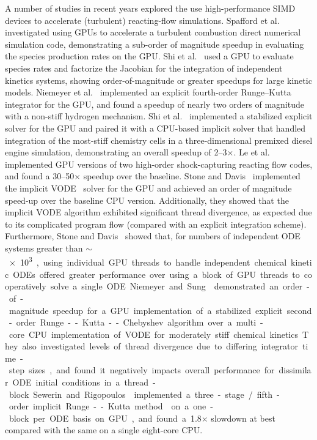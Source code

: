 \documentclass[preprint]{elsarticle}
\begin{document}
A number of studies in recent years explored the use high-performance SIMD devices to accelerate (turbulent) reacting-flow simulations.
Spafford et al.~\cite{Spafford:2010aa} investigated using GPUs to accelerate a turbulent combustion direct numerical simulation code, demonstrating a sub-order of magnitude speedup in evaluating the species production rates on the GPU.
Shi et al.~\cite{Shi:2011aa} used a GPU to evaluate species rates and factorize the Jacobian for the integration of independent kinetics systems, showing order-of-magnitude or greater speedups for large kinetic models.
Niemeyer et al.~\cite{Niemeyer:2011aa} implemented an explicit fourth-order Runge--Kutta integrator for the GPU, and found a speedup of nearly two orders of magnitude with a non-stiff hydrogen mechanism.
Shi et al.~\cite{Shi:2012aa} implemented a stabilized explicit solver for the GPU and paired it with a CPU-based implicit solver that handled integration of the most-stiff chemistry cells in a three-dimensional premixed diesel engine simulation, demonstrating an overall speedup of \numrange{2}{3}$\times$.
Le et al.~\cite{Le2013596} implemented GPU versions of two high-order shock-capturing reacting flow codes, and found a \numrange{30}{50}$\times$ speedup over the baseline.
Stone and Davis~\cite{Stone:2013aa} implemented the implicit VODE~\cite{Brown:1989vl} solver for the GPU and achieved an order of magnitude speed-up over the baseline CPU version.
Additionally, they showed that the implicit VODE algorithm exhibited significant thread divergence, as expected due to its complicated program flow (compared with an explicit integration scheme).
Furthermore, Stone and Davis~\cite{Stone:2013aa} showed that, for numbers of independent ODE systems greater than $\sim$\SI{e3}, using individual GPU threads to handle independent chemical kinetic ODEs offered greater performance over using a block of GPU threads to cooperatively solve a single ODE.
Niemeyer and Sung~\cite{Niemeyer:2014aa} demonstrated an order-of-magnitude speedup for a GPU implementation of a stabilized explicit second-order Runge--Kutta--Chebyshev algorithm over a multi-core CPU implementation of VODE for moderately stiff chemical kinetics.
They also investigated levels of thread divergence due to differing integrator time-step sizes, and found it negatively impacts overall performance for dissimilar ODE initial conditions in a thread-block.
Sewerin and Rigopoulos~\cite{Sewerin20151375} implemented a three-stage\slash fifth-order implicit Runge--Kutta method~\cite{wanner1991solving} on a one-block per ODE basis on GPU, and found a \num{1.8}$\times$ slowdown at best compared with the same on a single eight-core CPU.
\end{document}
